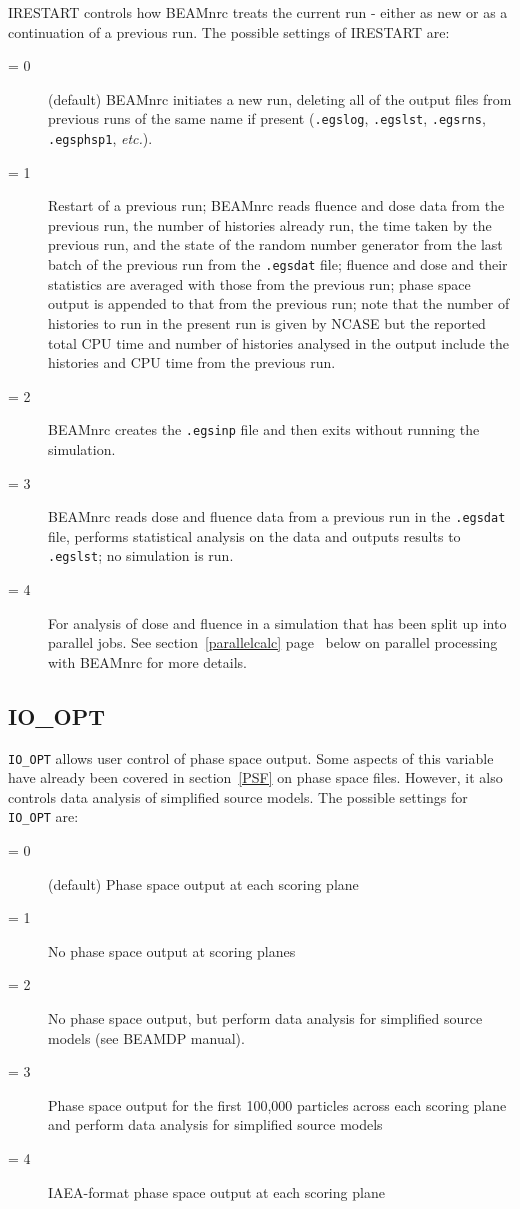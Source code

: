 \documentclass[12pt,twoside]{article}
\newcommand{\etc}{{\em etc.}}
\begin{document}
IRESTART controls how BEAMnrc treats the current run - either as new or as a
continuation of a previous run. The possible settings of IRESTART are:
\begin{description}
\item [= 0] (default) BEAMnrc initiates a new run, deleting all of the output
files from previous runs of the same name if present
(\verb+.egslog+, \verb+.egslst+, \verb+.egsrns+, \verb+.egsphsp1+,
 \etc).
\item [= 1] Restart of a previous run; BEAMnrc reads fluence and dose data
from the previous run, the number of histories already run, the time
taken by the previous run, and the state of the random number generator from
the last
batch of the previous run from the \verb+.egsdat+ file; fluence and dose and
their statistics are averaged with those from the previous run; phase
space output is appended to that from the previous run; note that the
number of histories to run in the present run is given by NCASE
but the reported total CPU time and number of histories analysed in the
output include the histories and CPU time from the previous run.
\item [= 2] BEAMnrc creates the \verb+.egsinp+ file and then exits without
running the simulation.
\item [= 3] BEAMnrc reads dose and fluence data from a previous run in the
\verb+.egsdat+ file, performs statistical analysis
on the data and outputs results to \verb+.egslst+; no simulation is run.
\item [= 4] For analysis of dose and fluence in a simulation that
has been split up into parallel jobs.  See section~\ref{parallelcalc}
page~\pageref{parallelcalc} below on parallel processing with BEAMnrc
for more details.
\end{description}

\subsection{IO\_OPT}
\label{ioopt}

\verb+IO_OPT+ allows user control of phase space output.  Some aspects of
this variable have already been covered in section~\ref{PSF} on phase space
files.  However, it also controls data analysis of simplified source
models.  The possible settings for
\verb+IO_OPT+ are:
\begin{description}
\item [= 0] (default) Phase space output at each scoring plane
\item [= 1] No phase space output at scoring planes
\item [= 2] No phase space output, but perform data analysis for
simplified source models (see BEAMDP manual).
\item [= 3] Phase space output for the first 100,000 particles across
each scoring plane and perform data analysis for simplified source
models
\item [= 4] IAEA-format phase space output at each scoring plane
\end{description}
\end{document}
